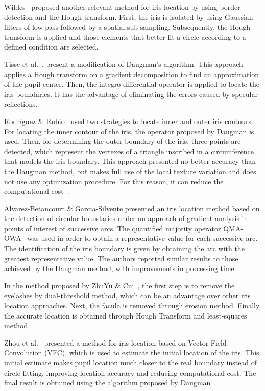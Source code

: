 \documentclass[conference]{IEEEtran}
\begin{document}
Wildes~\cite{wildes1997iris} proposed another relevant method for iris location by using border detection and the Hough transform. 
First, the iris is isolated by using Gaussian filters of low pass followed by a spatial sub-sampling. 
Subsequently, the Hough transform is applied and those elements that better fit a circle according to a defined condition are selected.

Tisse et al.~\cite{tisse2002iris}, present a modification of Daugman's algorithm. 
This approach applies a Hough transform on a gradient decomposition to find an approximation of the pupil center. 
Then, the integro-differential operator is applied to locate the iris boundaries.
It has the advantage of eliminating the errors caused by specular reflections.

Rodr\'iguez \& Rubio~\cite{rodriguez2005new} used two strategies to locate inner and outer iris contours. 
For locating the inner contour of the iris, the operator proposed by Daugman is used. 
Then, for determining the outer boundary of the iris, three points are detected, which represent the vertexes of a triangle inscribed in a circumference that models the iris boundary. This approach presented no better accuracy than the Daugman method, but makes full use of the local texture variation and does not use any optimization procedure. 
For this reason, it can reduce the computational cost~\cite{rodriguez2005new}. 

Alvarez-Betancourt \& Garcia-Silvente \cite{alvarez2010fast} presented an iris location method based on the detection of circular boundaries under an approach of gradient analysis in points of interest of successive arcs.
The quantified majority operator QMA-OWA~\cite{pelaez2006majority} was used in order to obtain a representative value for each successive arc. 
The identification of the iris boundary is given by obtaining the arc with the greatest representative value. The authors reported similar results to those achieved by the Daugman method, with improvements in processing time.

In the method proposed by ZhuYu \& Cui~\cite{cui2012rapid}, the first step is to remove the eyelashes by dual-threshold method, which can be an advantage over other iris location approaches. 
Next, the facula is removed through erosion method. 
Finally, the accurate location is obtained through Hough Transform and least-squares method.

Zhou et al.~\cite{zhou2013new} presented a method for iris location based on Vector Field Convolution (VFC), which is used to estimate the initial location of the iris. This initial estimate makes pupil location much closer to the real boundary instead of circle  fitting, improving location accuracy and reducing computational cost.
The final result is obtained using the algorithm proposed by Daugman~\cite{daugman2004iris}.
\end{document}
